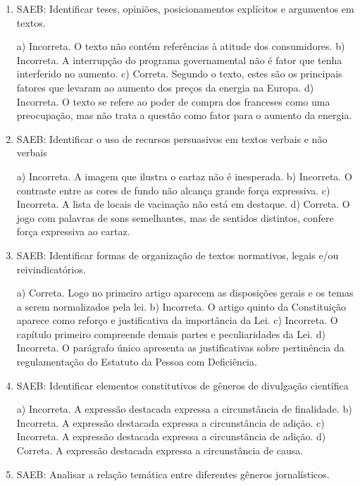 \begin{enumerate}

	\item
SAEB: Identificar teses, opiniões, posicionamentos explícitos e argumentos em
textos.

a) Incorreta. O texto não contém referências à atitude dos consumidores.
b) Incorreta. A interrupção do programa governamental não é fator que 
tenha interferido no aumento.
c) Correta. Segundo o texto, estes são os principais fatores que levaram
ao aumento dos preços da energia na Europa. 
d) Incorreta. O texto se refere ao poder de compra dos franceses como uma
preocupação, mas não trata a questão como fator para o aumento da energia.

	\item
SAEB: Identificar o uso de recursos persuasivos em textos verbais e não
verbais

a) Incorreta. A imagem que ilustra o cartaz não é inesperada.
b) Incorreta. O contraste entre as cores de fundo não alcança
grande força expressiva.
c) Incorreta. A lista de locais de vacinação não está em destaque.
d) Correta. O jogo com palavras de sons semelhantes, mas de sentidos
distintos, confere força expressiva ao cartaz.

	\item
SAEB: Identificar formas de organização de textos normativos, 
legais e/ou reivindicatórios.

a) Correta. Logo no primeiro artigo aparecem as disposições gerais e os
temas a serem normalizados pela lei.
b) Incorreta. O artigo quinto da Constituição aparece como reforço e
justificativa da importância da Lei.
c) Incorreta. O capítulo primeiro compreende demais partes e
peculiaridades da Lei.
d) Incorreta. O parágrafo único apresenta as justificativas sobre
pertinência da regulamentação do Estatuto da Pessoa com Deficiência.

	\item
SAEB: Identificar elementos constitutivos de gêneros de divulgação científica

a) Incorreta. A expressão destacada expressa a circunstância de finalidade.
b) Incorreta. A expressão destacada expressa a circunstância de adição.
c) Incorreta. A expressão destacada expressa a circunstância de adição.
d) Correta. A expressão destacada expressa a circunstância de causa.

	\item
SAEB: Analisar a relação temática entre diferentes gêneros jornalísticos.


\end{enumerate}
